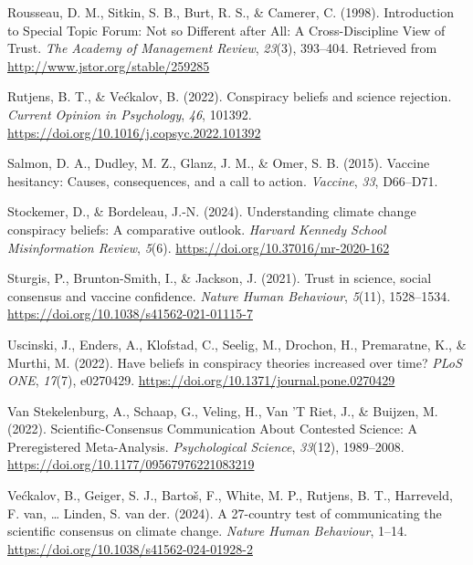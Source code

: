 \documentclass[
  doc,floatsintext]{apa6}
\newlength{\cslhangindent}
\newenvironment{CSLReferences}[2] %
 {\begin{list}{}{%
  \setlength{\itemindent}{0pt}
  \setlength{\leftmargin}{0pt}
  \setlength{\parsep}{0pt}
  \ifodd #1
   \setlength{\leftmargin}{\cslhangindent}
   \setlength{\itemindent}{-1\cslhangindent}
  \fi
  \setlength{\itemsep}{#2\baselineskip}}}
 {\end{list}}
\begin{document}
\begin{CSLReferences}{1}{0}
Rousseau, D. M., Sitkin, S. B., Burt, R. S., \& Camerer, C. (1998). Introduction to Special Topic Forum: Not so Different after All: A Cross-Discipline View of Trust. \emph{The Academy of Management Review}, \emph{23}(3), 393--404. Retrieved from \url{http://www.jstor.org/stable/259285}

Rutjens, B. T., \& Većkalov, B. (2022). Conspiracy beliefs and science rejection. \emph{Current Opinion in Psychology}, \emph{46}, 101392. \url{https://doi.org/10.1016/j.copsyc.2022.101392}

Salmon, D. A., Dudley, M. Z., Glanz, J. M., \& Omer, S. B. (2015). Vaccine hesitancy: Causes, consequences, and a call to action. \emph{Vaccine}, \emph{33}, D66--D71.

Stockemer, D., \& Bordeleau, J.-N. (2024). Understanding climate change conspiracy beliefs: A comparative outlook. \emph{Harvard Kennedy School Misinformation Review}, \emph{5}(6). \url{https://doi.org/10.37016/mr-2020-162}

Sturgis, P., Brunton-Smith, I., \& Jackson, J. (2021). Trust in science, social consensus and vaccine confidence. \emph{Nature Human Behaviour}, \emph{5}(11), 1528--1534. \url{https://doi.org/10.1038/s41562-021-01115-7}

Uscinski, J., Enders, A., Klofstad, C., Seelig, M., Drochon, H., Premaratne, K., \& Murthi, M. (2022). Have beliefs in conspiracy theories increased over time? \emph{PLoS ONE}, \emph{17}(7), e0270429. \url{https://doi.org/10.1371/journal.pone.0270429}

Van Stekelenburg, A., Schaap, G., Veling, H., Van 'T Riet, J., \& Buijzen, M. (2022). Scientific-Consensus Communication About Contested Science: A Preregistered Meta-Analysis. \emph{Psychological Science}, \emph{33}(12), 1989--2008. \url{https://doi.org/10.1177/09567976221083219}

Većkalov, B., Geiger, S. J., Bartoš, F., White, M. P., Rutjens, B. T., Harreveld, F. van, \ldots{} Linden, S. van der. (2024). A 27-country test of communicating the scientific consensus on climate change. \emph{Nature Human Behaviour}, 1--14. \url{https://doi.org/10.1038/s41562-024-01928-2}


\end{CSLReferences}
\end{document}
